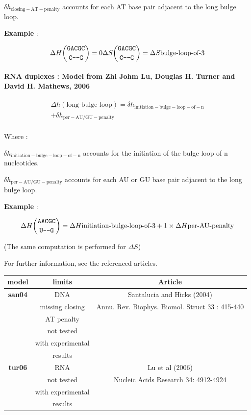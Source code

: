 \documentclass{article}
\begin{document}
$\delta{}h_\mathrm{closing-AT-penalty}$ accounts for each AT base pair adjacent
to the long bulge loop.

\textbf{Example} :

\begin{multline*}
\Delta H {\mbox{\texttt{GACGC}} \choose \mbox{\texttt{C---G}}} =
0
\Delta S {\mbox{\texttt{GACGC}} \choose \mbox{\texttt{C---G}}} =
\Delta S {\mbox{bulge-loop-of-3}} \\
\end{multline*}

\paragraph{RNA duplexes : \textbf{Model from Zhi Johm Lu, Douglas H. Turner and David H. Mathews, 2006}} 

\begin{multline*}
\Delta h {(\mbox{long-bulge-loop})} =
\delta{}h_\mathrm{initiation-bulge-loop-of-n} \\ +
\delta{}h_\mathrm{per-AU/GU-penalty}\\
\end{multline*}


Where :

$\delta{}h_\mathrm{initiation-bulge-loop-of-n}$ accounts for the initiation of the bulge loop of n nucleotides.

$\delta{}h_\mathrm{per-AU/GU-penalty}$ accounts for each AU or GU base pair adjacent
to the long bulge loop.


\textbf{Example} :

\begin{multline*}
\Delta H {\mbox{\texttt{AACGC}} \choose \mbox{\texttt{U---G}}} =
\Delta H {\mbox{initiation-bulge-loop-of-3}} +
1 \times \Delta H {\mbox{per-AU-penalty}} \\
\end{multline*}

       (The same computation is performed for $\Delta S$) 

For further information, see the referenced articles.

\begin{table}[hc]
\begin{tabular}[h]{| c | c | c |}
\textbf{model} & \textbf{limits} & \textbf{Article} \\
\hline
\textbf{san04} & DNA & Santalucia and Hicks (2004)\\
 & missing closing & Annu. Rev. Biophys. Biomol. Struct 33 : 415-440\\
 & AT penalty & \\
 & not tested & \\
 & with experimental & \\
 & results & \\
 \hline
\textbf{tur06} & RNA & Lu et al (2006)\\
 & not tested & Nucleic Acids Research 34: 4912-4924 \\
 & with experimental & \\
 & results & \\
 \hline
\end{tabular}
\end{table}
\end{document}
